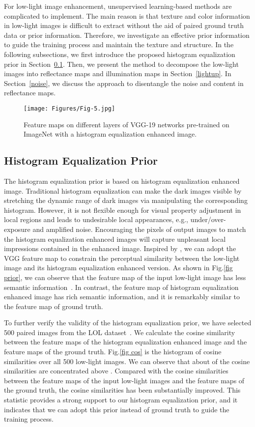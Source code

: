 \documentclass[journal]{IEEEtran}
\begin{document}
For low-light image enhancement, unsupervised learning-based methods are complicated to implement. The main reason is that texture and color information in low-light images is difficult to extract without the aid of paired ground truth data or prior information. Therefore, we investigate an effective prior information to guide the training process and maintain the texture and structure. In the following subsections, we first introduce the proposed histogram equalization prior in Section~\ref{hist}. Then, we present the method to decompose the low-light images into reflectance maps and illumination maps in Section~\ref{lightup}. In Section~\ref{noise}, we discuss the approach to disentangle the noise and content in reflectance maps.
\begin{figure}
\centering
 \texttt{[image: Figures/Fig-5.jpg]}
 \caption{Feature maps on different layers of VGG-19 networks pre-trained on ImageNet with a histogram equalization enhanced image.}
 \label{fig fea}
\end{figure}

\subsection{Histogram Equalization Prior}
\label{hist}
The histogram equalization prior is based on histogram equalization enhanced image. Traditional histogram equalization can make the dark images visible by stretching the dynamic range of dark images via manipulating the corresponding histogram. However, it is not flexible enough for visual property adjustment in local regions and leads to undesirable local appearances, e.g., under/over-exposure and amplified noise. Encouraging the pixels of output images to match the histogram equalization enhanced images will capture unpleasant local impressions contained in the enhanced image. Inspired by \cite{johnson2016perceptual}, we can adopt the VGG feature map to constrain the perceptual similarity between the low-light image and its histogram equalization enhanced version. As shown in Fig.\ref{fig prior}, we can observe that the feature map of the input low-light image has less semantic information~\cite{wang2021rethinking}. In contrast, the feature map of histogram equalization enhanced image has rich semantic information, and it is remarkably similar to the feature map of ground truth.

To further verify the validity of the histogram equalization prior, we have selected 500 paired images from the LOL dataset~\cite{Chen2018Retinex}. We calculate the cosine similarity between the feature maps of the histogram equalization enhanced image and the feature maps of the ground truth. Fig.\ref{fig cos} is the histogram of cosine similarities over all 500 low-light images. We can observe that about  of the cosine similarities are concentrated above . Compared with the cosine similarities between the feature maps of the input low-light images and the feature maps of the ground truth, the cosine similarities has been substantially improved. This statistic provides a strong support to our histogram equalization prior, and it indicates that we can adopt this prior instead of ground truth to guide the training process.
\end{document}

